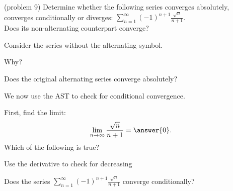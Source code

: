 \documentclass[handout]{ximera}
\begin{document}
\begin{problem}(problem 9)
Determine whether the following series converges absolutely, converges conditionally or diverges: $\displaystyle{\sum_{n=1}^\infty (-1)^{n+1} \frac{\sqrt n}{n + 1}}$.\\
Does its non-alternating counterpart converge?
\begin{hint} 
Consider the series without the alternating symbol.
\end{hint}
\begin{multipleChoice}
\end{multipleChoice}

Why?
\begin{multipleChoice}
\end{multipleChoice}




Does the original alternating series converge absolutely?
\begin{multipleChoice}
\end{multipleChoice}

We now use the AST to check for conditional convergence.

First, find the limit:
\[
\lim_{n\to\infty} \frac{\sqrt n}{n + 1} = \answer{0}.
\]
Which of the following is true? 
\begin{hint}
Use the derivative to check for decreasing
\end{hint}
\begin{multipleChoice}
\end{multipleChoice}


Does the series $\displaystyle{\sum_{n=1}^\infty (-1)^{n+1} \frac{\sqrt n}{n + 1}}$ converge conditionally?
\begin{multipleChoice}
\end{multipleChoice}

\end{problem}
\end{document}

